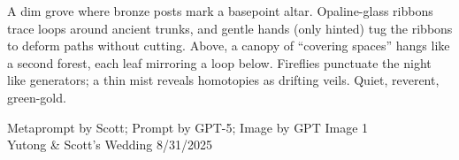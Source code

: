 \documentclass[12pt]{article}
\begin{document}
\noindent
\begin{adjustbox}{max size={\textwidth}{\textheight}}
\begin{varwidth}{\textwidth}
\RaggedRight
\footnotesize
A dim grove where bronze posts mark a basepoint altar. Opaline-glass ribbons trace loops around ancient trunks, and gentle hands (only hinted) tug the ribbons to deform paths without cutting. Above, a canopy of “covering spaces” hangs like a second forest, each leaf mirroring a loop below. Fireflies punctuate the night like generators; a thin mist reveals homotopies as drifting veils. Quiet, reverent, green-gold.
\end{varwidth}
\end{adjustbox}
\vfill
{\raggedleft\footnotesize
Metaprompt by Scott; Prompt by GPT-5; Image by GPT Image 1 \\
Yutong \& Scott's Wedding 8/31/2025\par}
\end{document}
